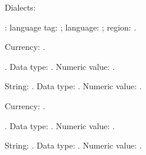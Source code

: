 \documentclass{article}
\begin{document}
Dialects:
\ForEachTrackedDialect\thisdialect
{
\par
\thisdialect:
language tag: \GetTrackedLanguageTag{\thisdialect};
language: \TrackedLanguageFromDialect{\thisdialect};
region: \TrackedIsoCodeFromLanguage{\TwoLetterIsoCountryCode}{\thisdialect}.
 }

Currency: \result.

\DTLparse{}\result.
Data type: \DTLgetDataTypeName{\DTLdatumtype{\result}}.
Numeric value: \DTLdatumvalue{\result}.

\DTLparse{}
String: \result.
Data type: \DTLgetDataTypeName{\DTLdatumtype{\result}}.
Numeric value: \DTLdatumvalue{\result}.

Currency: \result.

\DTLparse{}\result.
Data type: \DTLgetDataTypeName{\DTLdatumtype{\result}}.
Numeric value: \DTLdatumvalue{\result}.

\DTLparse{}
String: \result.
Data type: \DTLgetDataTypeName{\DTLdatumtype{\result}}.
Numeric value: \DTLdatumvalue{\result}.
\end{document}

